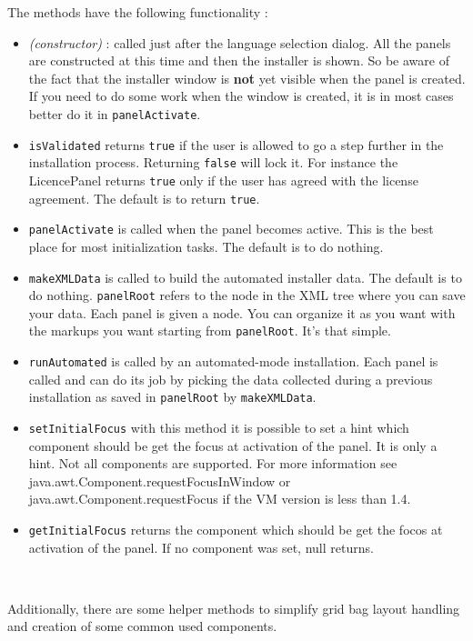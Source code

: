 The methods have the following functionality :\\
\begin{itemize}

  \item \textit{(constructor)} : called just after the language
  selection dialog. All the panels are constructed at this time and then
  the installer is shown. So be aware of the fact that the installer
  window is \textbf{not} yet visible when the panel is created. If you
  need to do some work when the window is created, it is in most cases
  better do it in \texttt{panelActivate}.\\

  \item \texttt{isValidated} returns \texttt{true} if the user is
  allowed to go a step further in the installation process. Returning
  \texttt{false} will lock it. For instance the LicencePanel returns
  \texttt{true} only if the user has agreed with the license agreement.
  The default is to return \texttt{true}.\\

  \item \texttt{panelActivate} is called when the panel becomes active.
  This is the best place for most initialization tasks. The default is
  to do nothing.\\

  \item \texttt{makeXMLData} is called to build the automated installer
  data. The default is to do nothing. \texttt{panelRoot} refers to the
  node in the XML tree where you can save your data. Each panel is given
  a node. You can organize it as you want with the markups you want
  starting from \texttt{panelRoot}. It's that simple.\\

  \item \texttt{runAutomated} is called by an automated-mode
  installation. Each panel is called and can do its job by picking the
  data collected during a previous installation as saved in
  \texttt{panelRoot} by \texttt{makeXMLData}.\\

  \item \texttt{setInitialFocus} with this method it is possible to set
  a hint which component should be get the focus at activation of the
  panel. It is only a hint. Not all components are supported. For more
  information see java.awt.Component.requestFocusInWindow or 
  java.awt.Component.requestFocus if the VM version is less than 1.4.\\
  
  \item \texttt{getInitialFocus} returns the component which should be get the
  focos at activation of the panel. If no component was set, null returns.\\

\end{itemize}\

Additionally, there are some helper methods to simplify grid bag layout handling
and creation of some common used components.

